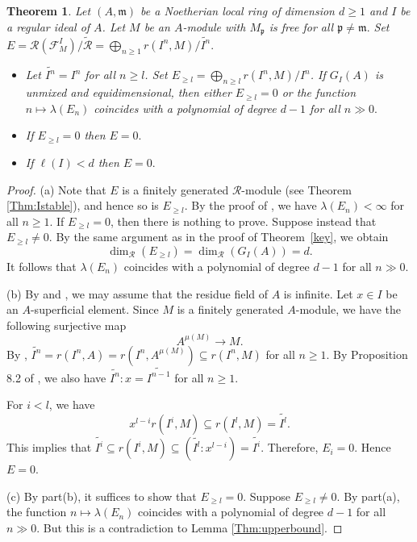 \documentclass[11pt]{amsart}
\theoremstyle{plain}
\newtheorem{theorem}{Theorem}[section]
\newcommand{\p}{\mathfrak{p}}
\newcommand{\m}{\mathfrak{m}}
\newcommand{\R}{\mathcal{R}}
\newcommand{\F}{\mathcal{F}}
\newcommand{\wt}{\widetilde}
\theoremstyle{plain}
\begin{document}
\begin{theorem}
\label{Thm:main}
  Let $(A,\mathfrak{m})$ be a Noetherian local ring of dimension $d\geq 1$ and $I$ be a regular ideal of $A$. Let $M$ be an $A$-module with $M_{\p}$ is free for all $\p\neq \m.$ Set $E = {\R({\F^I_M})}/{\wt{\R}}=\bigoplus_{n\geq 1}{r(I^n,M)}/{\wt{I^n}}.$
  \begin{itemize}
      \item [(a)] Let $\wt{I^n}=I^n$ for all $n\geq l$. Set  $E_{\geq l}=\bigoplus_{n\geq l}r(I^n,M)/I^n $. If ${G}_I(A)$ is unmixed and equidimensional, then either $E_{\geq l}=0$ or the function $n\mapsto \lambda(E_n)$ coincides with a polynomial of degree $d-1$ for all $n\gg0.$
      \item[(b)] If $E_{\geq l}=0$ then $E=0.$
      \item[(c)] If $\ell(I)<d$ then $E=0.$
  \end{itemize}
  \end{theorem}
  \begin{proof}
(a)  Note that $E$ is a finitely generated $\mathcal{R}$-module (see Theorem \ref{Thm:Istable}), and hence so is $E_{\geq l}$. By the proof of \cite[Theorem 6.7]{Zulfeqarr}, we have $\lambda(E_n) < \infty$ for all $n \geq 1$. If $E_{\geq l} = 0$, then there is nothing to prove. Suppose instead that $E_{\geq l} \neq 0$. By the same argument as in the proof of Theorem~\ref{key}, we obtain
$$\dim_{\mathcal{R}}(E_{\geq l}) = \dim_{\mathcal{R}}(G_I(A)) = d.$$
It follows that $\lambda(E_n)$ coincides with a polynomial of degree $d-1$ for all $n \gg 0$.



     (b) By \cite[1.4, 2.4]{Part1} and \cite[Proposition 1.4(d)]{Zulfeqarr}, we may assume that the residue field of $A$ is infinite. Let $x\in I$ be an $A$-superficial element.
Since $M$ is a finitely generated $A$-module, we have the following surjective map $$A^{\mu(M)}\to M.$$ By \cite[Proposition 1.4(a),(b)]{Zulfeqarr}, $\wt{I^n}=r(I^n,A)=r(I^n,A^{\mu(M)})\subseteq r(I^n,M)$ for all $n\geq 1$. By Proposition 8.2 of \cite{Zulfeqarr}, we also have $\wt{I^n}:x=\wt{I^{n-1}}$ for all $n\geq 1$.

For $i<l$, we have $$x^{l-i}r(I^i,M)\subseteq r(I^l,M)=\wt{I^l}.$$ This implies that $\wt{I^i} \subseteq r(I^i,M)\subseteq (\wt{I^l} : x^{l-i}) = \wt{I^i}$. Therefore, $E_i=0$. Hence $E=0.$

(c) By part(b), it suffices to show that $E_{\geq l}=0$. Suppose  $E_{\geq l}\neq 0$. By part(a), the function $n\mapsto \lambda(E_n)$ coincides with a polynomial of degree $d-1$ for all $n\gg0.$ But this is a contradiction to Lemma \ref{Thm:upperbound}.
  \end{proof}
\end{document}

